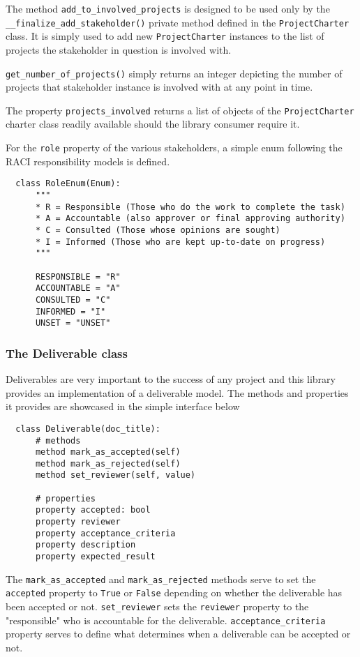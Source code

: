 The method \verb+add_to_involved_projects+ is designed to be used only by the \linebreak \verb+__finalize_add_stakeholder()+ private method defined in the \verb+ProjectCharter+ class. It is simply used to add new \verb+ProjectCharter+ instances to the list of projects the stakeholder in question is involved with.

\verb+get_number_of_projects()+ simply returns an integer depicting the number of projects that stakeholder instance is involved with at any point in time.

The property \verb+projects_involved+ returns a list of objects of the \verb+ProjectCharter+ charter class readily available should the library consumer require it.

For the \verb+role+ property of the various stakeholders, a simple enum following the RACI responsibility models is defined.

\begin{lstlisting}
  class RoleEnum(Enum):
      """
      * R = Responsible (Those who do the work to complete the task)
      * A = Accountable (also approver or final approving authority)
      * C = Consulted (Those whose opinions are sought)
      * I = Informed (Those who are kept up-to-date on progress)
      """

      RESPONSIBLE = "R"
      ACCOUNTABLE = "A"
      CONSULTED = "C"
      INFORMED = "I"
      UNSET = "UNSET"
\end{lstlisting}


\subsubsection{The Deliverable class}
Deliverables are very important to the success of any project and this library provides an implementation of a deliverable model. The methods and properties it provides are showcased in the simple interface below

\begin{lstlisting}
  class Deliverable(doc_title):
      # methods
      method mark_as_accepted(self)
      method mark_as_rejected(self)
      method set_reviewer(self, value)

      # properties
      property accepted: bool
      property reviewer
      property acceptance_criteria
      property description
      property expected_result
\end{lstlisting}

The \verb+mark_as_accepted+ and \verb+mark_as_rejected+ methods serve to set the \verb+accepted+ property to \verb+True+ or \verb+False+ depending on whether the deliverable has been accepted or not. \verb+set_reviewer+ sets the \verb+reviewer+ property to the "responsible" who is accountable for the deliverable. \verb+acceptance_criteria+ property serves to define what determines when a deliverable can be accepted or not.


